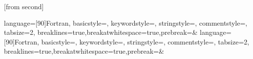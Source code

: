 















[from second]

\usepackage[english]{babel}

%

\usepackage[utf8]{inputenc}



\usepackage{amsmath}
\usepackage{amssymb}
\usepackage{latexsym}

\usepackage{pifont}


\usepackage{verbatim}
\usepackage{listings}

    {language=[90]Fortran,
    basicstyle=\ttfamily\footnotesize,
    keywordstyle=\color{blue}\ttfamily,
    stringstyle=\color{brown}\ttfamily,
    commentstyle=\color{red}\ttfamily,
    tabsize=2,
    breaklines=true,breakatwhitespace=true,prebreak=\space\&
  }
    {language=[90]Fortran,
    basicstyle=\ttfamily\scriptsize,
    keywordstyle=\color{blue}\ttfamily,
    stringstyle=\color{brown}\ttfamily,
    commentstyle=\color{red}\ttfamily,
    tabsize=2,
    breaklines=true,breakatwhitespace=true,prebreak=\space\&
  }

